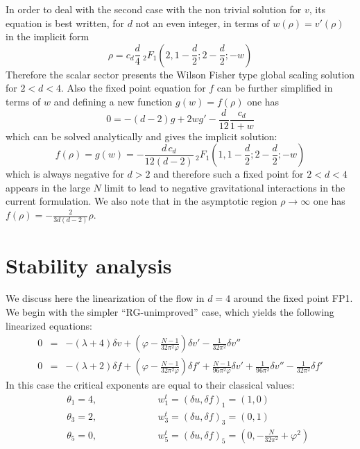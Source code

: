 \documentclass[a4paper,11pt]{revtex4}
\newcommand{\be}{\begin{equation}}
\newcommand{\ee}{\end{equation}}
\newcommand{\bea}{\begin{eqnarray}}
\newcommand{\eea}{\end{eqnarray}}
\begin{document}
In order to deal with the  second case with the non trivial solution for $v$, its equation is best written, 
for $d$ not an even integer, in terms of $w(\rho)=v'(\rho)$ in the implicit form
\be
\rho=c_d \frac{d}{4}  \ _2F_1\left(2,1-\frac{d}{2};2-\frac{d}{2};-w\right)
\ee
Therefore the scalar sector presents the Wilson Fisher type global scaling solution for $2<d<4$.
Also the fixed point equation for $f$ can be further simplified in terms of $w$ and defining a new function $g(w)=f(\rho)$ one has
\be
0=-(d-2) g+2 w g'-\frac{ d}{12}\frac{c_d} {1+w}
\ee
which can be solved analytically and gives the implicit solution:
\be
f(\rho)=g(w)=-\frac{d \,c_d}{12 (d-2)} \, _2F_1\left(1,1-\frac{d}{2};2-\frac{d}{2};-w\right)
\ee
which is always negative for $d>2$ and therefore such a fixed point for $2<d<4$ appears in the large $N$ limit to lead to negative gravitational interactions in the current formulation.
We also note that in the asymptotic region $\rho\to\infty$ one has $f(\rho)= -\frac{2 }{3 d (d-2) } \rho$.


\section{Stability analysis}

We discuss here the linearization of the flow in $d=4$ around the
fixed point FP1.
We begin with the simpler ``RG-unimproved'' case,
which yields the following linearized equations:
\bea
0&=& 
-(\lambda +4)\delta v 
+\left(\varphi-\frac{N-1}{32\pi^2\varphi}\right)\delta v'
-\frac{1}{32\pi^2}\delta v''  \\
0&=& -(\lambda +2)\delta f
+\left(\varphi-\frac{N-1}{32\pi^2\varphi}\right)\delta f'
+\frac{N-1}{96\pi^2\varphi}\delta v'
+\frac{1}{96\pi^2}\delta v''
-\frac{1}{32\pi^2}\delta f'
\eea
In this case the critical exponents are equal to their classical values:
\bea
&{}&\theta_1=4 , \qquad \qquad  \qquad \ w_1^t=(\delta u,\delta\! f)_1 = (1,0) \\
&{}&\theta_3=2 , \qquad  \qquad  \qquad \ w_3^t=(\delta u,\delta\! f)_3 = (0,1) \nonumber\\
&{}&\theta_5=0 , \qquad  \qquad \qquad \ w_5^t=(\delta u,\delta\! f)_5 
=\left(0, \nonumber-\frac{N}{32\pi^2}+\varphi^2\right)
\eea
\end{document}
